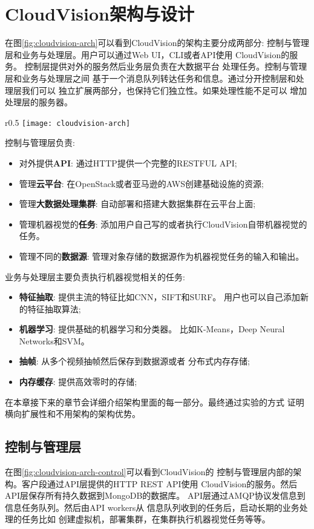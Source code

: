 \chapter{CloudVision架构与设计}
\label{cha:architecture}
在图\ref{fig:cloudvision-arch}可以看到CloudVision的架构主要分成两部分:
控制与管理层和业务与处理层。用户可以通过Web UI，CLI或者API使用
CloudVision的服务。 控制层提供对外的服务然后业务层负责在大数据平台
处理任务。控制与管理层和业务与处理层之间
基于一个消息队列转达任务和信息。通过分开控制层和处理层我们可以
独立扩展两部分，也保持它们独立性。如果处理性能不足可以
增加处理层的服务器。
\begin{wrapfigure}{r}{0.5\textwidth}
  \centering
  \texttt{[image: cloudvision-arch]}
  \caption{CloudVision 总体架构}
  \label{fig:cloudvision-arch}
\end{wrapfigure}
控制与管理层负责:
\begin{itemize}
  \item 对外提供\textbf{API}: 通过HTTP提供一个完整的RESTFUL API;
  \item 管理\textbf{云平台}: 在OpenStack或者亚马逊的AWS创建基础设施的资源;
  \item 管理\textbf{大数据处理集群}: 自动部署和搭建大数据集群在云平台上面;
  \item 管理机器视觉的\textbf{任务}: 添加用户自己写的或者执行CloudVision自带机器视觉的任务。
  \item 管理不同的\textbf{数据源}: 管理对象存储的数据源作为机器视觉任务的输入和输出。
\end{itemize}
业务与处理层主要负责执行机器视觉相关的任务:
\begin{itemize}
  \item \textbf{特征抽取}: 提供主流的特征比如CNN，SIFT和SURF。
        用户也可以自己添加新的特征抽取算法;
  \item \textbf{机器学习}: 提供基础的机器学习和分类器。
        比如K-Means，Deep Neural Networks和SVM。
  \item \textbf{抽帧}: 从多个视频抽帧然后保存到数据源或者
        分布式内存存储;
  \item \textbf{内存缓存}: 提供高效零时的存储;
\end{itemize}

在本章接下来的章节会详细介绍架构里面的每一部分。最终通过实验的方式
证明横向扩展性和不用架构的架构优势。


\section{控制与管理层}
\label{sec:arch_control}
在图\ref{fig:cloudvision-arch-control}可以看到CloudVision的
控制与管理层内部的架构。客户段通过API层提供的HTTP REST API使用
CloudVision的服务。然后API层保存所有持久数据到MongoDB的数据库。
API层通过AMQP协议发信息到信息任务队列。然后由API workers从
信息队列收到的任务后，启动长期的业务处理的任务比如
创建虚拟机，部署集群，在集群执行机器视觉任务等等。

